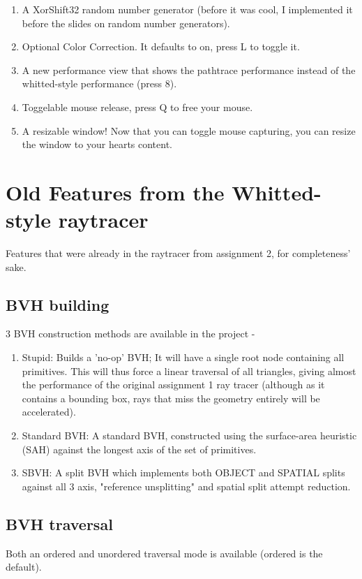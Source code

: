 \begin{enumerate}
    \item A XorShift32 random number generator (before it was cool, I implemented it before the slides on random number generators).
    \item Optional Color Correction. It defaults to on, press L to toggle it.
    \item A new performance view that shows the pathtrace performance instead of the whitted-style performance (press 8).
    \item Toggelable mouse release, press Q to free your mouse.
    \item A resizable window! Now that you can toggle mouse capturing, you can resize the window to your hearts content.
\end{enumerate}




\section{Old Features from the Whitted-style raytracer}
Features that were already in the raytracer from assignment 2, for completeness' sake.

\subsection{BVH building}
3 BVH construction methods are available in the project -
    \begin{enumerate}
        \item Stupid: Builds a 'no-op' BVH; It will have a single root node containing all primitives. This will thus force a linear traversal of all triangles, giving almost the performance of the original assignment 1 ray tracer (although as it contains a bounding box, rays that miss the geometry entirely will be accelerated).
        \item Standard BVH: A standard BVH, constructed using the surface-area heuristic (SAH) against the longest axis of the set of primitives.
        \item SBVH: A split BVH which implements both OBJECT and SPATIAL splits against all 3 axis, "reference unsplitting" and spatial split attempt reduction.
    \end{enumerate}

\subsection{BVH traversal}
Both an ordered and unordered traversal mode is available (ordered is the default).

